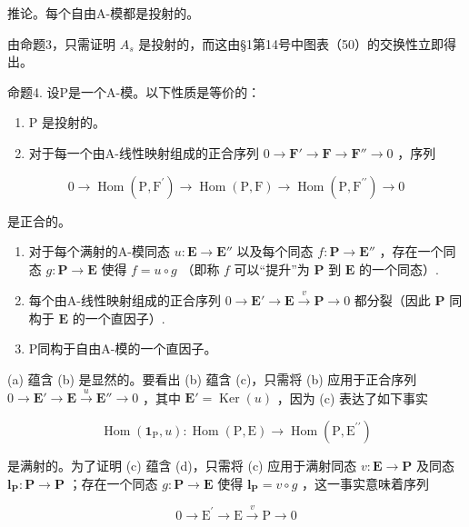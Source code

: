 推论。每个自由A-模都是投射的。

由命题3，只需证明 \(A_{s}\) 是投射的，而这由§1第14号中图表（50）的交换性立即得出。

命题4. 设P是一个A-模。以下性质是等价的：

\begin{enumerate}
\def\labelenumi{(\alph{enumi})}
\item
  P 是投射的。
\item
  对于每一个由A-线性映射组成的正合序列 \(0 \to \mathbf{F}' \to \mathbf{F} \to \mathbf{F}'' \to 0\) ，序列
\end{enumerate}

\[
0 \rightarrow \operatorname{Hom} (\mathrm{P}, \mathrm{F} ^ {\prime}) \rightarrow \operatorname{Hom} (\mathrm{P}, \mathrm{F}) \rightarrow \operatorname{Hom} (\mathrm{P}, \mathrm{F} ^ {\prime \prime}) \rightarrow 0
\]

是正合的。

\begin{enumerate}
\def\labelenumi{(\alph{enumi})}
\setcounter{enumi}{2}
\item
  对于每个满射的A-模同态 \(u: \mathbf{E} \to \mathbf{E}''\) 以及每个同态 \(f: \mathbf{P} \to \mathbf{E}''\) ，存在一个同态 \(g: \mathbf{P} \to \mathbf{E}\) 使得 \(f = u \circ g\) （即称 \(f\) 可以“提升”为 \(\mathbf{P}\) 到 \(\mathbf{E}\) 的一个同态）.
\item
  每个由A-线性映射组成的正合序列 \(0 \to \mathbf{E}' \to \mathbf{E} \xrightarrow{v} \mathbf{P} \to 0\) 都分裂（因此 \(\mathbf{P}\) 同构于 \(\mathbf{E}\) 的一个直因子）.
\item
  P同构于自由A-模的一个直因子。
\end{enumerate}

(a) 蕴含 (b) 是显然的。要看出 (b) 蕴含 (c)，只需将 (b) 应用于正合序列 \(0 \to \mathbf{E}' \to \mathbf{E} \xrightarrow{u} \mathbf{E}'' \to 0\) ，其中 \(\mathbf{E}' = \operatorname{Ker}(u)\) ，因为 (c) 表达了如下事实

\[
\operatorname{Hom} \left(\mathbf {1} _ {\mathrm{P}}, u\right): \operatorname{Hom} (\mathrm{P}, \mathrm{E}) \rightarrow \operatorname{Hom} (\mathrm{P}, \mathrm{E} ^ {\prime \prime})
\]

是满射的。为了证明 (c) 蕴含 (d)，只需将 (c) 应用于满射同态 \(v: \mathbf{E} \to \mathbf{P}\) 及同态 \(\mathbf{l}_{\mathbf{P}}: \mathbf{P} \to \mathbf{P}\) ；存在一个同态 \(g: \mathbf{P} \to \mathbf{E}\) 使得 \(\mathbf{l}_{\mathbf{P}} = v \circ g\) ，这一事实意味着序列

\[
0 \longrightarrow \mathrm{E} ^ {\prime} \longrightarrow \mathrm{E} \stackrel {v} {\longrightarrow} \mathrm{P} \longrightarrow 0
\]

